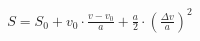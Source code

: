\documentclass[preview]{standalone}
\begin{document}
\begin{align*}
S = S_{0} + v_{0} \cdot \frac{v - v_{0}}{a} + \frac{a}{2} \cdot (\frac{\Delta v}{a})^2
\end{align*}
\end{document}

